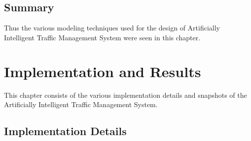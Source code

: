 \documentclass[openany,12pt]{report}
\begin{document}

	
	\section{Summary}
	\hspace*{0.5in}Thus the various modeling techniques used for the design of Artificially Intelligent Traffic Management System were seen in this chapter.
	
	
	
		
		\chapter{Implementation and Results}
		\hspace*{0.5in}This chapter consists of the various implementation details and snapshots of the Artificially Intelligent Traffic Management System.
		
		\section{Implementation Details}
		
\end{document}
